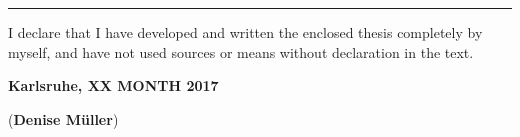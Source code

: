 \vspace*{\fill}

\rule{1.0\textwidth}{0.6pt}

\vspace*{0.75em}

I declare that I have developed and written the enclosed thesis completely by myself, and have not used sources or means without declaration in the text.

\vspace*{0.75em}

\textbf{Karlsruhe, XX MONTH 2017}

\vspace*{4em}

\dotfill \hspace*{8cm} 

\hspace*{1.79cm}(\textbf{Denise M\"uller})